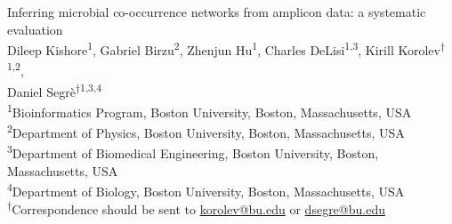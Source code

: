 
\begin{titlepage}

  \newcommand{\HRule}{\rule{\linewidth}{0.5mm}} %

  \center %





  \vspace*{\fill}
  {\huge Inferring microbial co-occurrence networks from amplicon data: a systematic evaluation}\\[0.4cm]


  \vspace{1.5 cm}
  Dileep Kishore\textsuperscript{1},
  Gabriel Birzu\textsuperscript{2},
  Zhenjun Hu\textsuperscript{1},
  Charles DeLisi\textsuperscript{1,3},
  Kirill Korolev\textsuperscript{$\dagger$1,2},\\
  Daniel Segr\`{e}\textsuperscript{$\dagger$1,3,4}\\
  \vspace{1cm}
  \textsuperscript{1}Bioinformatics Program, Boston University, Boston, Massachusetts, USA\\
  \textsuperscript{2}Department of Physics, Boston University, Boston, Massachusetts, USA\\
  \textsuperscript{3}Department of Biomedical Engineering, Boston University, Boston, Massachusetts, USA\\
  \textsuperscript{4}Department of Biology, Boston University, Boston, Massachusetts, USA\\
  \textsuperscript{$\dagger$}Correspondence should be sent to \href{mailto:korolev@bu.edu}{korolev@bu.edu} or \href{mailto:dsegre@bu.edu}{dsegre@bu.edu}\\


\end{titlepage}
